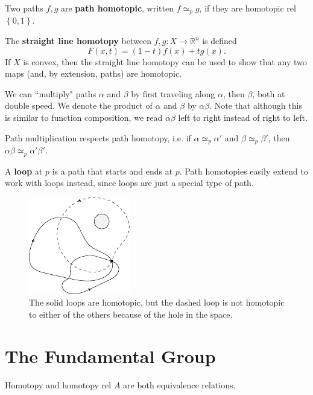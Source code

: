 \documentclass[twoside,10pt]{report}
\begin{document}
\begin{defn}[]
Two paths $f,g$ are \textbf{path homotopic}, written $f \simeq_p g$, if they are homotopic rel $\left\{ 0,1 \right\}$.
\end{defn}

The \textbf{straight line homotopy} between $f,g:X\to \mathbb{R}^{n}$ is defined
\[
	F(x,t) = (1-t)f(x)+tg(x).
\] 
If $X$ is convex, then the straight line homotopy can be used to show that any two maps (and, by extension, paths) are homotopic.

We can ``multiply" paths $\alpha$ and $\beta$ by first traveling along $\alpha$, then $\beta$, both at double speed. We denote the product of $\alpha$ and $\beta$ by $\alpha\beta$. Note that although this is similar to function composition, we read $\alpha\beta$ left to right instead of right to left.

\begin{prop}
Path multiplication respects path homotopy, i.e. if $\alpha \simeq_p \alpha'$ and $\beta \simeq_p \beta'$, then $\alpha\beta \simeq_{p} \alpha'\beta'$.
\end{prop}

A \textbf{loop} at $p$ is a path that starts and ends at $p$. Path homotopies easily extend to work with loops instead, since loops are just a special type of path.

\begin{figure}[H]
	\centering
	\includegraphics[scale=1.5]{fig/homotopic.pdf}
	\caption{The solid loops are homotopic, but the dashed loop is not homotopic to either of the others because of the hole in the space.}
\end{figure}


\section{The Fundamental Group}

\begin{lem}
Homotopy and homotopy rel $A$ are both equivalence relations.
\end{lem}
\end{document}
